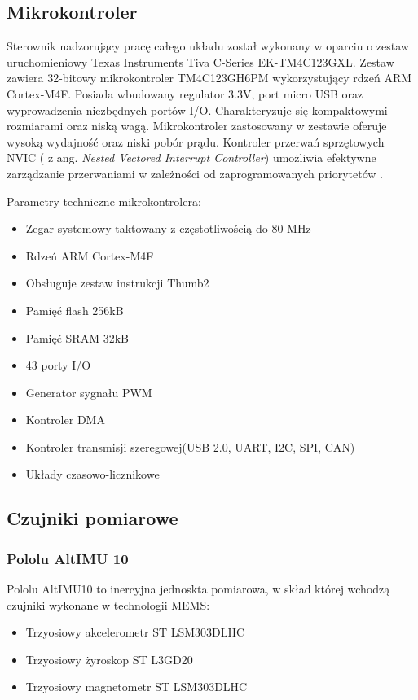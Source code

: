 \subsection{Mikrokontroler}
Sterownik nadzorujący pracę całego układu został wykonany w oparciu o zestaw uruchomieniowy Texas Instruments Tiva C-Series EK-TM4C123GXL. Zestaw zawiera 32-bitowy mikrokontroler TM4C123GH6PM wykorzystujący rdzeń ARM Cortex-M4F. Posiada wbudowany regulator 3.3V, port micro USB oraz wyprowadzenia niezbędnych portów I/O. Charakteryzuje się kompaktowymi rozmiarami oraz niską wagą. Mikrokontroler zastosowany w zestawie 	oferuje wysoką wydajność oraz niski pobór prądu. Kontroler przerwań sprzętowych NVIC ( z ang. {\em Nested Vectored Interrupt Controller}) umożliwia efektywne zarządzanie przerwaniami w zależności od zaprogramowanych priorytetów \cite{tiva}.

Parametry techniczne mikrokontrolera:
\begin{itemize}
\item
Zegar systemowy taktowany z częstotliwością do 80 MHz
\item
Rdzeń ARM Cortex-M4F
\item 
Obsługuje zestaw instrukcji Thumb2
\item
Pamięć flash 256kB
\item
Pamięć SRAM 32kB
\item
43 porty I/O
\item
Generator sygnału PWM
\item
Kontroler DMA
\item
Kontroler transmisji szeregowej(USB 2.0, UART, I2C, SPI, CAN)
\item
Układy czasowo-licznikowe
\end{itemize} 
\subsection{Czujniki pomiarowe}
\subsubsection{Pololu AltIMU 10}

Pololu AltIMU10 to inercyjna jednoskta pomiarowa, w skład której wchodzą czujniki wykonane w technologii MEMS:
\begin{itemize}
\item
Trzyosiowy akcelerometr ST LSM303DLHC
\item
Trzyosiowy żyroskop ST L3GD20
\item
Trzyosiowy magnetometr ST LSM303DLHC
\end{itemize}

